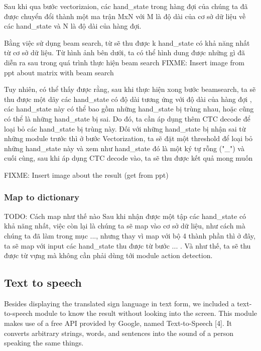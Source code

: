       Sau khi qua bước vectorizaion, các hand_state trong hàng đợi của chúng ta
      đã được chuyển đổi thành một ma trận MxN với M là độ dài của cơ sở dữ liệu về
      các hand_state và N là độ dài của hàng đợi.
      
      Bằng việc sử dụng beam search, từ sẽ thu được k hand_state có khả năng nhất
      từ cơ sở dữ liệu. Từ hình ảnh bên dưới, ta có thể hình dung được những gì
      đã diễn ra sau trong quá trình thực hiện beam search
      FIXME: Insert image from ppt about matrix with beam search

      Tuy nhiên, có thể thấy được rằng, sau khi thực hiện xong bước beamsearch,
      ta sẽ thu được một dãy các hand_state có độ dài tương ứng với độ dài của hàng đợi
      , các hand_state này có thể bao gồm những hand_state bị trùng nhau, hoặc cũng có thể
      là những hand_state bị sai. Do đó, ta cần áp dụng thêm CTC decode để loại bỏ các hand_state
      bị trùng này. Đối với những hand_state bị nhận sai từ những module trước thì ở bước Vectorization,
      ta sẽ đặt một threshold để loại bỏ những hand_state này và xem như hand_state đó là một ký tự rỗng ("_")
      và cuối cùng, sau khi áp dụng CTC decode vào, ta sẽ thu được kết quả mong muốn

      FIXME: Insert image about the result (get from ppt)

      
      
    \subsubsection{ Map to dictionary }
      TODO: Cách map như thế nào
      Sau khi nhận được một tập các hand_state có khả năng nhất, việc còn lại là
      chúng ta sẽ map vào cơ sở dữ liệu, như cách mà chúng ta đã làm trong mục ..., 
      nhưng thay vì map với bộ 4 thành phần thì ở đây, ta sẽ map với input các hand_state thu được
      từ bước ... .
      Và như thế, ta sẽ thu được từ vựng mà không cần phải dùng tới module action detection.

\subsection{Text to speech}

Besides displaying the translated sign language in text form, we included a text-to-speech module to know the result without looking into the screen. This module makes use of a free API provided by Google, named Text-to-Speech [4]. It converts arbitrary strings, words, and sentences into the sound of a person speaking the same things.
